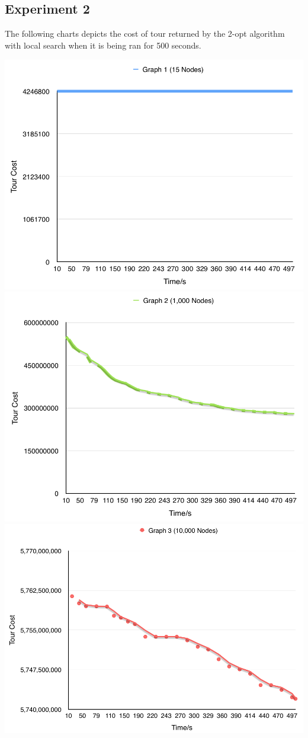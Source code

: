 \documentclass[paper=a4, fontsize=11pt]{scrartcl}	%
\numberwithin{equation}{section}		%
\numberwithin{figure}{section}			%
\numberwithin{table}{section}				%
\begin{document}
\subsection{Experiment 2}
The following charts depicts the cost of tour returned by the 2-opt algorithm with local search when it is being ran for 500 seconds.
\begin{center}
\includegraphics[scale=0.3]{fig1.png} \\
\includegraphics[scale=0.3]{fig2.png} \\
\includegraphics[scale=0.3]{fig3.png} 

\end{center}
\end{document}

